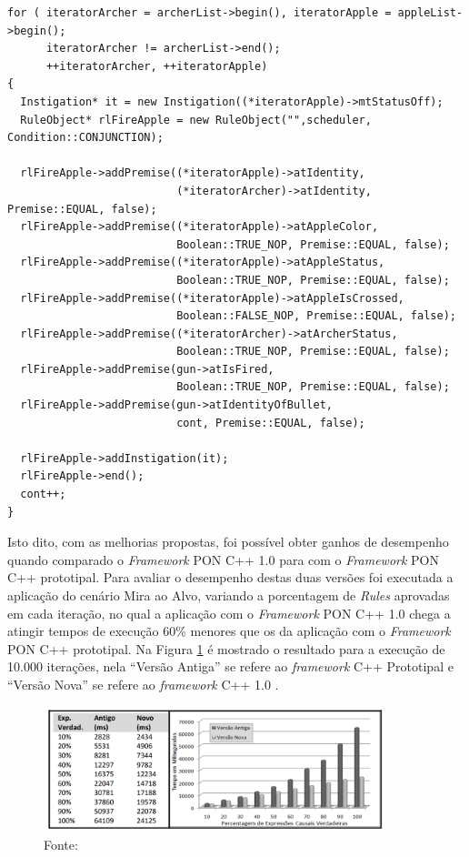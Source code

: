 \begin{lstlisting}[caption = {Exemplo de programa com o \textit{framework} C++ 1.0},
source = {Adaptado de \citeonline{msc_Banaszewski_2009}},
   label = {cod:fw1_ex}, float=htb]
for ( iteratorArcher = archerList->begin(), iteratorApple = appleList->begin(); 
      iteratorArcher != archerList->end();
      ++iteratorArcher, ++iteratorApple)
{	
  Instigation* it = new Instigation((*iteratorApple)->mtStatusOff);
  RuleObject* rlFireApple = new RuleObject("",scheduler, Condition::CONJUNCTION);

  rlFireApple->addPremise((*iteratorApple)->atIdentity,
                          (*iteratorArcher)->atIdentity, Premise::EQUAL, false);
  rlFireApple->addPremise((*iteratorApple)->atAppleColor,
                          Boolean::TRUE_NOP, Premise::EQUAL, false);
  rlFireApple->addPremise((*iteratorApple)->atAppleStatus,
                          Boolean::TRUE_NOP, Premise::EQUAL, false);
  rlFireApple->addPremise((*iteratorApple)->atAppleIsCrossed,
                          Boolean::FALSE_NOP, Premise::EQUAL, false);
  rlFireApple->addPremise((*iteratorArcher)->atArcherStatus,
                          Boolean::TRUE_NOP, Premise::EQUAL, false);
  rlFireApple->addPremise(gun->atIsFired,
                          Boolean::TRUE_NOP, Premise::EQUAL, false);
  rlFireApple->addPremise(gun->atIdentityOfBullet,
                          cont, Premise::EQUAL, false);

  rlFireApple->addInstigation(it);
  rlFireApple->end();
  cont++;
}
\end{lstlisting}

Isto dito, com as melhorias propostas, foi possível obter ganhos de desempenho
quando comparado o \textit{Framework} PON C++ 1.0  para com o \textit{Framework}
PON C++ prototipal. Para avaliar o desempenho destas duas versões foi executada
a aplicação do cenário Mira ao Alvo, variando a porcentagem de \textit{Rules}
aprovadas em cada iteração, no qual a aplicação com o \textit{Framework} PON C++
1.0 chega a atingir tempos de execução 60\% menores que os da aplicação com o
\textit{Framework} PON C++ prototipal. Na Figura \ref{fig:fw1_vs_prot} é
mostrado o resultado para a execução de 10.000 iterações, nela \enquote{Versão Antiga}
se refere ao \textit{framework} C++ Prototipal e \enquote{Versão Nova} se refere ao
\textit{framework} C++ 1.0 \cite{msc_Banaszewski_2009}.

\begin{figure}[!htb]
  \centering
  \caption{Comparação do desempenho do \textit{framework} C++ 1.0 com o
  \textit{framework} C++ Prototipal}
  \includegraphics[width=0.9\textwidth]{../figures/fw1_vs_prot.png}
  \caption*{Fonte:
  }
  \label{fig:fw1_vs_prot}
\end{figure}

